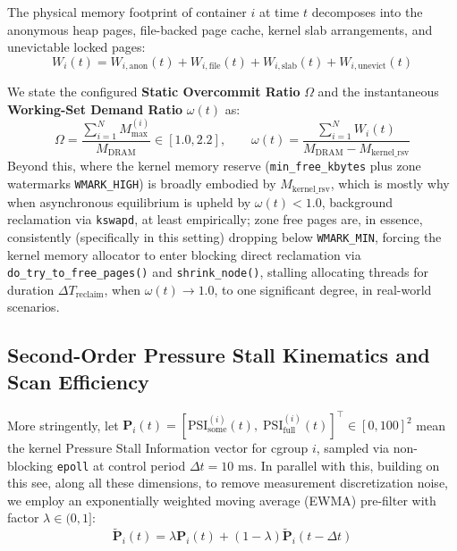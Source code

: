 \documentclass[pdflatex,sn-mathphys,Numbered]{sn-jnl}
\begin{document}
The physical memory footprint of container $i$ at time $t$ decomposes into the anonymous heap pages, file-backed page cache, kernel slab arrangements, and unevictable locked pages:
\begin{equation}
W_i(t) = W_{i,\text{anon}}(t) + W_{i,\text{file}}(t) + W_{i,\text{slab}}(t) + W_{i,\text{unevict}}(t)
\label{eq:footprint}
\end{equation}

We state the configured \textbf{Static Overcommit Ratio} $\Omega$ and the instantaneous \textbf{Working-Set Demand Ratio} $\omega(t)$ as:
\begin{equation}
\Omega = \frac{\sum_{i=1}^N M_{\text{max}}^{(i)}}{M_{\text{DRAM}}} \in [1.0, 2.2], \qquad \omega(t) = \frac{\sum_{i=1}^N W_i(t)}{M_{\text{DRAM}} - M_{\text{kernel\_rsv}}}
\label{eq:overcommit_ratios}
\end{equation}
Beyond this, where the kernel memory reserve (\texttt{min\_free\_kbytes} plus zone watermarks \texttt{WMARK\_HIGH}) is broadly embodied by $M_{\text{kernel\_rsv}}$, which is mostly why when asynchronous equilibrium is upheld by $\omega(t) < 1.0$, background reclamation via \texttt{kswapd}, at least empirically; zone free pages are, in essence, consistently (specifically in this setting) dropping below \texttt{WMARK\_MIN}, forcing the kernel memory allocator to enter blocking direct reclamation via \texttt{do\_try\_to\_free\_pages()} and \texttt{shrink\_node()}, stalling allocating threads for duration $\Delta T_{\text{reclaim}}$, when $\omega(t) \to 1.0$, to one significant degree, in real-world scenarios.

\subsection{Second-Order Pressure Stall Kinematics and Scan Efficiency}
More stringently, let $\mathbf{P}_i(t) = [\text{PSI}_{\text{some}}^{(i)}(t), \; \text{PSI}_{\text{full}}^{(i)}(t)]^\top \in [0, 100]^2$ mean the kernel Pressure Stall Information vector for cgroup $i$, sampled via non-blocking \texttt{epoll} at control period $\Delta t = 10\text{ ms}$. In parallel with this, building on this see, along all these dimensions, to remove measurement discretization noise, we employ an exponentially weighted moving average (EWMA) pre-filter with factor $\lambda \in (0, 1]$:
\begin{equation}
\tilde{\mathbf{P}}_i(t) = \lambda \mathbf{P}_i(t) + (1 - \lambda)\tilde{\mathbf{P}}_i(t - \Delta t)
\label{eq:ewma}
\end{equation}
\end{document}
